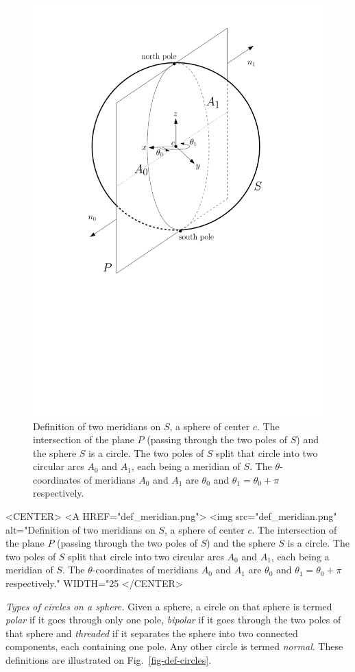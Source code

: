 \begin{ccTexOnly}
\begin{figure}[ht!]
\centerline{
 \includegraphics[height=.5\textwidth]{Circular_kernel_3/def_meridian}
}
\caption{Definition of two meridians on $S$, a sphere of center $c$.
The intersection of the plane $P$ (passing through the two poles of $S$)
and the sphere $S$ is a circle. The two poles of $S$ split that circle into two circular arcs $A_0$ and $A_1$, each being a meridian of $S$. 
The $\theta$-coordinates of meridians $A_0$ and $A_1$ are $\theta_0$ and $\theta_1= \theta_0 + \pi$ respectively.
\label{fig-def-meridian}}
\end{figure}
\end{ccTexOnly}

\begin{ccHtmlOnly}
    <CENTER>
    <A HREF="def_meridian.png">
        <img src="def_meridian.png" alt="Definition of two meridians on $S$, a sphere of center $c$.
The intersection of the plane $P$ (passing through the two poles of $S$)
and the sphere $S$ is a circle. The two poles of $S$ split that circle into two circular arcs $A_0$ and $A_1$, each being a meridian of $S$. 
The $\theta$-coordinates of meridians $A_0$ and $A_1$ are $\theta_0$ and $\theta_1= \theta_0 + \pi$ respectively." WIDTH="25%
    </CENTER>
\end{ccHtmlOnly}


\textit{Types of circles on a sphere.}
Given a sphere, a circle on that sphere is termed
\textit{polar} if it goes through only one pole, \textit{bipolar} if
it goes through the two poles of that sphere and \textit{threaded} if
it separates the sphere into two connected components, each
containing one pole. Any other circle is termed \textit{normal}. These
definitions are illustrated on Fig.~\ref{fig-def-circles}.

